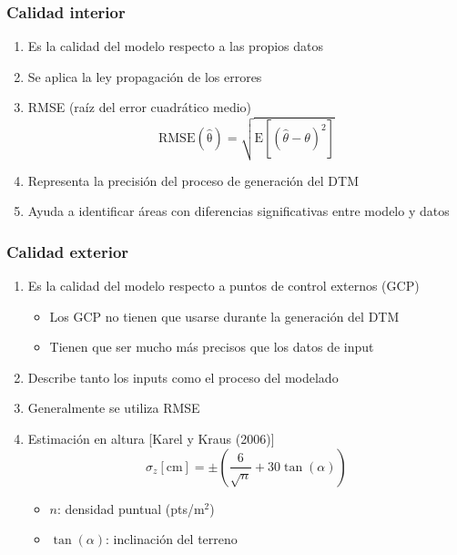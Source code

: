 \begin{frame}
  \frametitle{Calidad interior}
  \begin{enumerate}
    \item<1-> Es la calidad del modelo respecto a las propios datos
    \item<2-> Se aplica la ley propagación de los errores
    \item<2-> \alert<2>{RMSE} (raíz del error cuadrático medio)
      \[ \mathrm{RMSE(\widehat\theta)}=\sqrt{\mathrm{E}\left[(\widehat\theta - \theta)^2\right]}\]
    \item<3-> Representa la precisión del proceso de generación del DTM 
    \item<3-> Ayuda a identificar áreas con diferencias significativas entre
      modelo y datos
  \end{enumerate}
\end{frame}
\begin{frame}
  \frametitle{Calidad exterior}
  \begin{enumerate}
    \item<1-> Es la calidad del modelo respecto a puntos de control externos (GCP)
      \begin{itemize}
        \item Los GCP no tienen que usarse durante la generación del DTM
        \item Tienen que ser mucho más precisos que los datos de input
      \end{itemize}
    \item<2-> Describe tanto los inputs como el proceso del modelado
    \item<2-> Generalmente se utiliza \alert<2>{RMSE}
    \item<3-> Estimación en \alert{altura} [Karel y Kraus (2006)]
        \[\sigma_z[\mathrm{cm}] = \pm\left(\dfrac{6}{\sqrt{n}} +
        30\tan(\alpha)\right)\]
      \begin{itemize}
        \item $n$: densidad puntual (pts/m$^2$)
        \item $\tan(\alpha)$: inclinación del terreno
      \end{itemize}
  \end{enumerate}
\end{frame}
